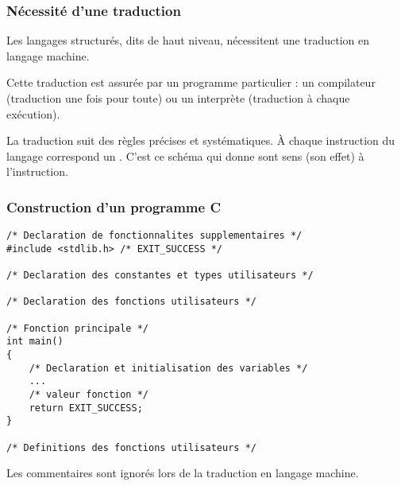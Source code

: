 \documentclass[xcolor=svgnames]{beamer}
\begin{document}
\begin{frame}
  \frametitle{Nécessité d'une traduction\nowrite}
  Les langages structurés, dits de haut niveau, nécessitent une \alert{traduction
  en langage machine}.\pause

Cette traduction est assurée par un programme particulier : un compilateur
 (traduction une fois pour toute) ou un interprète (traduction à
 chaque exécution).\pause

 La traduction suit des règles précises et systématiques. À chaque
 instruction du langage correspond un . C'est ce schéma qui donne sont sens (son effet) à
 l'instruction.
\end{frame}
\begin{frame}[fragile]
  \frametitle{Construction d'un programme C\nowrite}
\begin{lstlisting}[basicstyle=\ttfamily\scriptsize]
/* Declaration de fonctionnalites supplementaires */
#include <stdlib.h> /* EXIT_SUCCESS */

/* Declaration des constantes et types utilisateurs */

/* Declaration des fonctions utilisateurs */

/* Fonction principale */
int main()
{
    /* Declaration et initialisation des variables */
    ...
    /* valeur fonction */
    return EXIT_SUCCESS;
}

/* Definitions des fonctions utilisateurs */
\end{lstlisting}

Les commentaires sont ignorés lors de la traduction en langage machine.
\end{frame}
\end{document}
